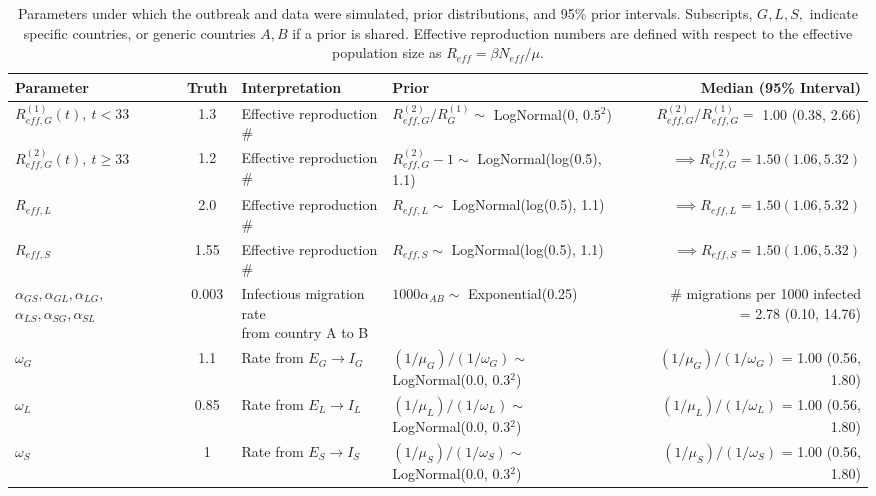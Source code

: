 \begin{table}
	\begin{fullpage}
		\caption[Parameters and priors for a simulated Ebola outbreak in West Africa.]{Parameters under which the outbreak and data were simulated, prior distributions, and 95\% prior intervals. Subscripts, $ G,L,S, $ indicate specific countries, or generic countries $ A,B $ if a prior is shared. Effective reproduction numbers are defined with respect to the effective population size as $ R_{eff} = \beta N_{eff} /\mu $.}
		\label{tab:ebola_synth_pars}
		\scriptsize
	\centering
	\begin{tabular}{lcllr}
		\hline
		\textbf{Parameter} & \textbf{Truth} & \textbf{Interpretation} & \textbf{Prior} & \textbf{Median (95\% Interval)} \\ \hline
		$ R_{eff,G}^{(1)}(t),\ t<33 $ & 1.3 & Effective reproduction \#  & $ R_{eff,G}^{(2)} / R_G^{(1)}\sim $ LogNormal(0, 0.5$ ^2 $) & $ R_{eff,G}^{(2)} / R_{eff,G}^{(1)} = $ 1.00 (0.38, 2.66) \\
		$ R_{eff,G}^{(2)}(t),\ t\geq33 $ & 1.2 & Effective reproduction \# & $ R_{eff,G}^{(2)}-1\sim $ LogNormal(log(0.5), 1.1) & $ \implies R_{eff,G}^{(2)} = 1.50 (1.06, 5.32)$ \\
		$ R_{eff,L} $ & 2.0 & Effective reproduction \# & $ R_{eff,L}\sim $ LogNormal(log(0.5), 1.1) & $ \implies R_{eff,L} = 1.50 (1.06, 5.32)$ \\
		$ R_{eff,S} $ & 1.55 & Effective reproduction \# & $ R_{eff,S}\sim $ LogNormal(log(0.5), 1.1) & $ \implies R_{eff,S} = 1.50 (1.06, 5.32)$ \\
		\makecell[l]{$ \alpha_{GS},\alpha_{GL}, \alpha_{LG},$\\
		$ \alpha_{LS},\alpha_{SG}, \alpha_{SL} $} & 0.003 & \makecell[l]{Infectious migration rate \\ from country A to B} & $ 1000\alpha_{AB} \sim$ Exponential(0.25) & \makecell[r]{\# migrations per 1000 infected \\ = 2.78 (0.10, 14.76)}\\ 
		$ \omega_G $ & 1.1 & Rate from $ E_G\rightarrow I_G $ & $ (1/\mu_G)\big/(1/\omega_G) \sim $ LogNormal(0.0, 0.3$ ^2 $) & $ (1/\mu_G)\big/(1/\omega_G) $ = 1.00 (0.56, 1.80) \\
		$ \omega_L $ & 0.85 & Rate from $ E_L\rightarrow I_L $ & $ (1/\mu_L)\big/(1/\omega_L) \sim $ LogNormal(0.0, 0.3$ ^2 $) & $ (1/\mu_L)\big/(1/\omega_L) $ = 1.00 (0.56, 1.80) \\
		$ \omega_S $ & 1 & Rate from $ E_S\rightarrow I_S $ & $ (1/\mu_S)\big/(1/\omega_S) \sim $ LogNormal(0.0, 0.3$ ^2 $) & $ (1/\mu_S)\big/(1/\omega_S) $ = 1.00 (0.56, 1.80) \\

\end{tabular}
\end{fullpage}
\end{table}
